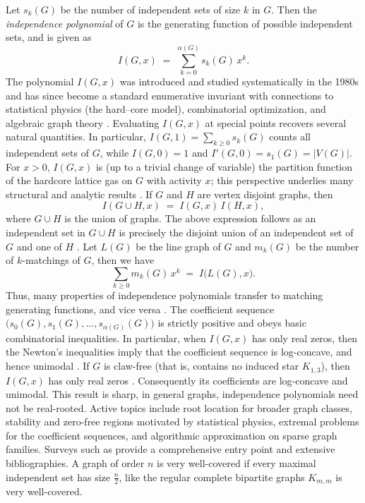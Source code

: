 \documentclass[12pt,twoside]{article}
\begin{document}
Let $s_k(G)$ be the number of independent sets of size $k$ in $G$. Then the \emph{independence polynomial} of $G$ is the generating function of possible independent sets, and is given as
$$
I(G,x)\;=\;\sum_{k=0}^{\alpha(G)} s_k(G)\,x^k.
$$
The polynomial $I(G,x)$ was introduced and studied systematically in the 1980s and has since become a standard enumerative invariant with connections to statistical physics (the hard–core model), combinatorial optimization, and algebraic graph theory \cite{gutman,levitsurvey}. Evaluating $I(G,x)$ at special points recovers several natural quantities. In particular, $I(G,1)=\sum_{k\ge 0}s_k(G)$ counts all independent sets of $G$, while $I(G,0)=1$ and $I'(G,0)=s_1(G)=|V(G)|$. For $x>0$, $I(G,x)$ is (up to a trivial change of variable) the partition function of the hardcore lattice gas on $G$ with activity $x$; this perspective underlies many structural and analytic results \cite{Weitz}.
If $G$ and $H$ are vertex disjoint graphs, then
$$
I(G\cup H,x)\;=\;I(G,x)\,I(H,x),
$$
where $G\cup H$ is the union of graphs. The above expression follows as an independent set in $G\cup H$ is precisely the disjoint union of an independent set of $G$ and one of $H$ \cite{gutman,levitsurvey, levitdiscrete,haynes}. Let $L(G)$ be the line graph of $G$ and $m_k(G)$ be the number of $k$-matchings of $G$, then we have
$$
\sum_{k\ge 0} m_k(G)\,x^k\;=\;I\bigl(L(G),x\bigr).
$$
Thus, many properties of independence polynomials transfer to matching generating functions, and vice versa \cite{levitsurvey}.
The coefficient sequence $\bigl(s_0(G),s_1(G),\dots,s_{\alpha(G)}(G)\bigr)$ is strictly positive and obeys basic combinatorial inequalities. In particular, when $I(G,x)$ has only real zeros, then the Newton's inequalities imply that the coefficient sequence is log-concave, and hence unimodal \cite{levitsurvey}. If $G$ is claw-free (that is, contains no induced star $K_{1,3}$), then $I(G,x)$ has only real zeros \cite{ChudnovskySeymour2007}. Consequently its coefficients are log-concave and unimodal. This result is sharp, in general graphs, independence polynomials need not be real-rooted. Active topics include root location for broader graph classes, stability and zero-free regions motivated by statistical physics, extremal problems for the coefficient sequences, and algorithmic approximation on sparse graph families. Surveys such as \cite{levitsurvey,goddard} provide a comprehensive entry point and extensive bibliographies. A graph of order $n$ is very well-covered if every maximal independent set has size  $\tfrac{n}{2}$, like the regular complete bipartite graphs $K_{m,m}$ is very well-covered.
\end{document}
